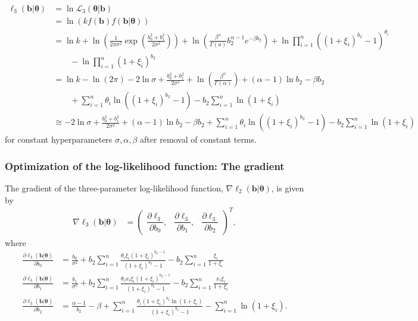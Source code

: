\documentclass[11pt, letterpaper]{article}
\newcommand{\mc}[1]{\mathcal{#1}}
\numberwithin{equation}{section}
\begin{document}
\begin{align*}
\ell_3(\bm b | \bm \theta) &= \ln \mc L_3(\bm \theta | \bm b) \\
&= \ln( kf(\bm b)f(\bm b | \bm \theta)) \\
&=\ln k + \ln \left(\frac{1}{2\pi \sigma^2} \exp \left(\frac{b_0^2 + b_1^2}{2\sigma^2} \right) \right) + \ln \left(\frac{\beta^\alpha}{\Gamma(a)} b_2^{\alpha-1}e^{-\beta b_2}\right) + \ln\prod_{i=1}^n \left( (1+\xi_i)^{b_2}-1 \right)^{\theta_i} \\
&\qquad - \ln \prod_{i=1}^n (1+\xi_i)^{b_2} \\
&= \ln k - \ln(2\pi) - 2 \ln \sigma + \frac{b_0^2 + b_1^2}{2\sigma^2} + \ln \left( \frac{\beta^\alpha}{\Gamma(\alpha)} \right) + (\alpha-1)\ln b_2 -\beta b_2 \\
&\qquad + \sum_{i=1}^n \theta_i \ln \left((1+\xi_i)^{b_2}-1\right) - b_2\sum_{i=1}^n  \ln (1+\xi_i) \\
&\cong - 2 \ln \sigma + \frac{b_0^2 + b_1^2}{2\sigma^2} + (\alpha-1)\ln b_2 -\beta b_2  + \sum_{i=1}^n \theta_i \ln \left((1+\xi_i)^{b_2}-1\right) - b_2\sum_{i=1}^n  \ln (1+\xi_i)
\end{align*}
for constant hyperparameters $\sigma, \alpha, \beta$ after removal of constant terms.

\subsubsection{Optimization of the log-likelihood function: The gradient}
The gradient of the three-parameter log-likelihood function, $\nabla \ell_2(\bm b | \bm \theta)$, is given by
\begin{align*}
\nabla \ell_3(\bm b | \bm \theta) &= \begin{pmatrix}
\dfrac{\partial \ell_3}{\partial b_0},   & \dfrac{\partial \ell_3}{\partial b_1} , & \dfrac{\partial \ell_3}{\partial b_2} 
\end{pmatrix}^T,
\end{align*}
where 
\begin{align*}
\frac{\partial \ell_3 (\bm b | \bm \theta)}{\partial b_0}   &= \frac{b_0}{\sigma^2} + b_2 \sum_{i=1}^n \frac{\theta_i \xi_i\left(1+\xi_i \right)^{b_2-1}}{(1+\xi_i)^{b_2} - 1} - b_2 \sum_{i=1}^n \frac{\xi_i}{1+ \xi_i} \\
\frac{\partial \ell_3 (\bm b | \bm \theta)}{\partial b_1}   &= \frac{b_1}{\sigma^2} + b_2 \sum_{i=1}^n \frac{\theta_i x_i \xi_i\left(1+ \xi_i\right)^{b_2-1}}{(1+\xi_i)^{b_2} - 1} - b_2 \sum_{i=1}^n \frac{x_i \xi_i}{1+\xi_i} \\
\frac{\partial \ell_3 (\bm b | \bm \theta)}{\partial b_2}   &= \frac{\alpha -1}{b_2} - \beta + \sum_{i=1}^n \frac{\theta_i (1+\xi_i)^{b_2}\ln(1+\xi_i)}{(1+\xi_i)^{b_2}-1}  -\sum_{i=1}^n  \ln (1+\xi_i).
\end{align*}
\end{document}

